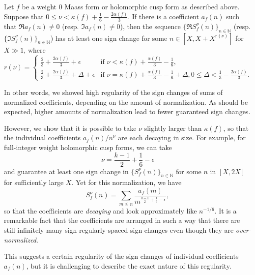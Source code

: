 \begin{theorem}
  Let $f$ be a weight $0$ Maass form or holomorphic cusp form as described above.
  Suppose that $0 \leq \nu < \kappa(f) + \frac{1}{6} - \frac{2 \alpha(f)}{3}$.
  If there is a coefficient $a_f(n)$ such that $\Re a_f(n) \neq 0$ (resp. $\Im a_f(n) \neq
  0$), then the sequence $\{\Re S_f^\nu(n)\}_{n \in \mathbb{N}}$ (resp. $\{\Im
S^\nu_f(n)\}_{n \in \mathbb{N}}$) has at least one sign change for some $n \in [X, X +
X^{r(\nu)}]$ for $X \gg 1$, where
  \begin{equation}
    r(\nu) = \begin{cases}
      \frac{2}{3} + \frac{2\alpha(f)}{3} + \epsilon & \text{if } \nu < \kappa(f) +
      \frac{\alpha(f)}{3} - \frac{1}{6}, \\
      \frac{2}{3} + \frac{2\alpha(f)}{3} + \Delta + \epsilon & \text{if } \nu = \kappa(f)
      + \frac{\alpha(f)}{3} - \frac{1}{6} + \Delta, 0 \leq \Delta < \frac{1}{3} - \frac{2
      \alpha(f)}{3}.
    \end{cases}
  \end{equation}
\end{theorem}


In other words, we showed high regularity of the sign changes of sums of normalized
coefficients, depending on the amount of normalization.
As should be expected, higher amounts of normalization lead to fewer guaranteed sign
changes.


However, we show that it is possible to take $\nu$ slightly larger than $\kappa(f)$, so
that the individual coefficients $a_f(n)/n^\nu$ are each decaying in size.
For example, for full-integer weight holomorphic cusp forms, we can take
\begin{equation}
  \nu = \frac{k-1}{2} + \frac{1}{6} - \epsilon
\end{equation}
and guarantee at least one sign change in $\{S_f^\nu(n)\}_{n \in \mathbb{N}}$ for some $n$
in $[X, 2X]$ for sufficiently large $X$.
Yet for this normalization, we have
\begin{equation}
  S_f^\nu(n) = \sum_{m \leq n} \frac{a_f(m)}{m^{\frac{k-1}{2} + \frac{1}{6} - \epsilon}},
\end{equation}
so that the coefficients are \emph{decaying} and look approximately like $n^{-1/6}$.
It is a remarkable fact that the coefficients are arranged in such a way that there are
still infinitely many sign regularly-spaced sign changes even though they are
\emph{over-normalized}.

This suggests a certain regularity of the sign changes of individual coefficients
$a_f(n)$, but it is challenging to describe the exact nature of this regularity.




